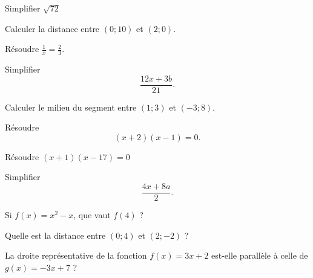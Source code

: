 \begin{MentalActivity}

\begin{mental}
            Simplifier \( \sqrt{72}\)
\end{mental}

\begin{mental}
            Calculer la distance entre \( (0;10)\) et \( (2;0)\).
\end{mental}

\begin{mental}
            Résoudre \( \frac{1}{ x }=\frac{ 2 }{ 3 }\).
\end{mental}

\begin{mental}
            Simplifier 
            \begin{equation*}
                \frac{ 12x+3b }{ 21 }.
            \end{equation*}
\end{mental}

\begin{mental}
            Calculer le milieu du segment entre \( (1;3)\) et \( (-3;8)\).
\end{mental}

\begin{mental}
            Résoudre
            \begin{equation*}
                (x+2)(x-1)=0.
            \end{equation*}
\end{mental}


\end{MentalActivity}
\begin{MentalActivity}

\begin{mental}
            Résoudre \( (x+1)(x-17)=0\)
\end{mental}

\begin{mental}
            Simplifier
            \begin{equation*}
                \frac{ 4x+8a }{ 2 }.
            \end{equation*}
\end{mental}

\begin{mental}
            Si \( f(x)=x^2-x\), que vaut \( f(4)\) ?
\end{mental}

\begin{mental}
            Quelle est la distance entre \( (0;4)\) et \( (2;-2)\) ?
\end{mental}

\begin{mental}
            La droite représentative de la fonction \( f(x)=3x+2\) est-elle parallèle à celle de \( g(x)=-3x+7\) ?
\end{mental}


\end{MentalActivity}
